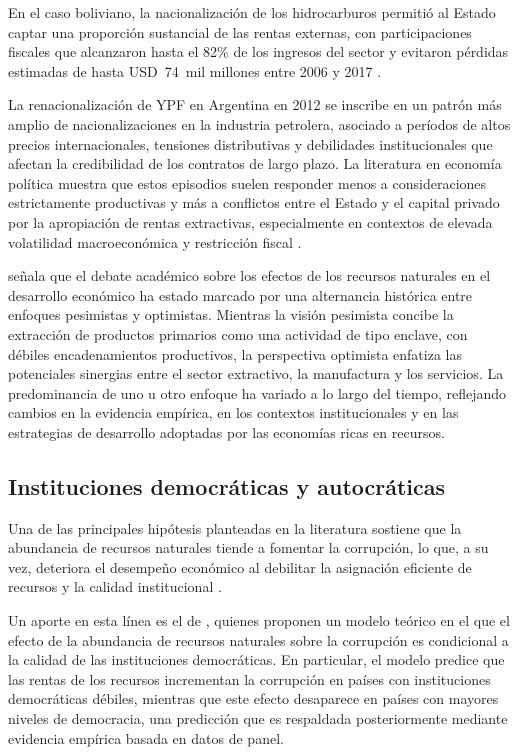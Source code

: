 \documentclass[../../PTFM.tex]{subfiles}
\begin{document}
	En el caso boliviano, la nacionalización de los hidrocarburos permitió al Estado captar una proporción sustancial de las rentas externas, con participaciones fiscales que alcanzaron hasta el 82\% de los ingresos del sector y evitaron pérdidas estimadas de hasta USD~74~mil millones entre 2006 y 2017 \parencite{CELAG2019}.
	
	La renacionalización de YPF en Argentina en 2012 se inscribe en un patrón más amplio de nacionalizaciones en la industria petrolera, asociado a períodos de altos precios internacionales, tensiones distributivas y debilidades institucionales que afectan la credibilidad de los contratos de largo plazo. La literatura en economía política muestra que estos episodios suelen responder menos a consideraciones estrictamente productivas y más a conflictos entre el Estado y el capital privado por la apropiación de rentas extractivas, especialmente en contextos de elevada volatilidad macroeconómica y restricción fiscal \parencite{Guriev2011}.
	
	\textcite{Lebdioui2019} señala que el debate académico sobre los efectos de los recursos naturales en el desarrollo económico ha estado marcado por una alternancia histórica entre enfoques pesimistas y optimistas. Mientras la visión pesimista concibe la extracción de productos primarios como una actividad de tipo enclave, con débiles encadenamientos productivos, la perspectiva optimista enfatiza las potenciales sinergias entre el sector extractivo, la manufactura y los servicios. La predominancia de uno u otro enfoque ha variado a lo largo del tiempo, reflejando cambios en la evidencia empírica, en los contextos institucionales y en las estrategias de desarrollo adoptadas por las economías ricas en recursos.
	
	\subsection{Instituciones democráticas y autocráticas}
	\label{subsec:instituciones}
	
	Una de las principales hipótesis planteadas en la literatura sostiene que la abundancia de recursos naturales tiende a fomentar la corrupción, lo que, a su vez, deteriora el desempeño económico al debilitar la asignación eficiente de recursos y la calidad institucional \parencite{Isham2005,Sala-i-Martin2013}.
	
	Un aporte en esta línea es el de \textcite{Bhattacharyya2010}, quienes proponen un modelo teórico en el que el efecto de la abundancia de recursos naturales sobre la corrupción es condicional a la calidad de las instituciones democráticas. En particular, el modelo predice que las rentas de los recursos incrementan la corrupción en países con instituciones democráticas débiles, mientras que este efecto desaparece en países con mayores niveles de democracia, una predicción que es respaldada posteriormente mediante evidencia empírica basada en datos de panel.
	
\end{document}
